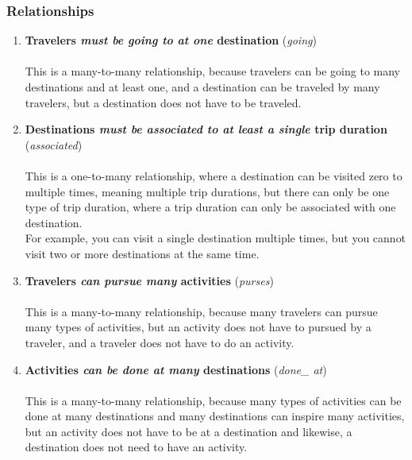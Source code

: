 \documentclass[letterpaper,10pt,onecolumn,compsoc]{IEEEtran}
\begin{document}
\subsubsection{Relationships}

\begin{enumerate}

\item 
\textbf{Travelers \textit{must be going to at one} destination} (\textit{going})
\\ ~ \\
This is a many-to-many relationship, because travelers can be going to many destinations and at least one, and a destination can be traveled by many travelers, but a destination does not have to be traveled.
\\

\item 
\textbf{Destinations \textit{must be associated to at least a single} trip duration} (\textit{associated})
\\ ~ \\
This is a one-to-many relationship, where a destination can be visited zero to multiple times, meaning multiple trip durations, but there can only be one type of trip duration, where a trip duration can only be associated with one destination. 
\\
For example, you can visit a single destination multiple times, but you cannot visit two or more destinations at the same time.
\\

\item 
\textbf{Travelers \textit{can pursue many} activities} (\textit{purses})
\\ ~ \\
This is a many-to-many relationship, because many travelers can pursue many types of activities, but an activity does not have to pursued by a traveler, and a traveler does not have to do an activity.
\\

\item 
\textbf{Activities \textit{can be done at many} destinations} (\textit{done\_ at})
\\ ~ \\
This is a many-to-many relationship, because many types of activities can be done at many destinations and many destinations can inspire many activities, but an activity does not have to be at a destination and likewise, a destination does not need to have an activity.

\end{enumerate}
\end{document}
